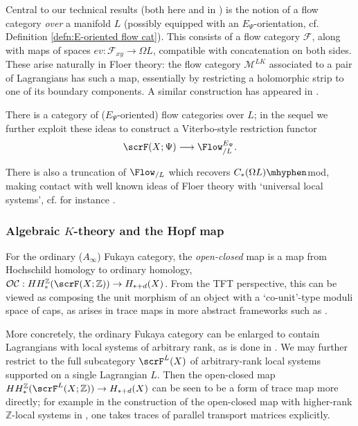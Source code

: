 \documentclass{TPmod}
\def\bZ{\mathbb{Z}}
\newcommand{\cC}{\mathcal{C}}
\newcommand{\cF}{\mathcal{F}}
\newcommand{\cM}{\mathcal{M}}
\newcommand{\cO}{\mathcal{O}}
\def\bZ{\mathbb{Z}}
\numberwithin{equation}{section}
\begin{document}
    Central to our technical results (both here and in \cite{PS4}) is the notion of a flow category \emph{over} a manifold $L$ (possibly equipped with an $E_\Psi$-orientation, cf. Definition \ref{defn:E-oriented flow cat}). This consists of a flow category $\cF$, along with maps of spaces $ev: \cF_{xy} \to \Omega L$, compatible with concatenation on both sides. These arise naturally in Floer theory: the flow category $\cM^{LK}$ associated to a pair of Lagrangians has such a map, essentially by restricting a holomorphic strip to one of its boundary components. A similar construction has appeared in \cite{Barraud-Cornea,Abouzaid:based_loops, BDHO}. 
    
There is a category of ($E_{\Psi}$-oriented) flow categories over $L$; in the sequel \cite{PS4} we further exploit these ideas to construct a Viterbo-style restriction functor
    \[
    \scrF(X;\Psi) \longrightarrow {\Flow}^{E_{\Psi}}_{/L}.
    \]

    
\begin{rmk}
   There is also a truncation of $\Flow_{/L}$ which recovers $C_*(\Omega L)\mhyphen$mod, making contact with well known ideas of  Floer theory with `universal local systems', cf. for instance \cite{BDHO, BDHO2}.
\end{rmk}

  
\subsubsection*{Algebraic $K$-theory and the Hopf map}
    For the ordinary ($A_\infty$) Fukaya category, the \emph{open-closed} map is a map from Hochschild homology to ordinary homology, $\cO\cC: HH_*^\bZ(\scrF(X; \bZ)) \to H_{*+d}(X)$. From the TFT perspective, this can be viewed as composing the unit morphism of an object with a `co-unit'-type moduli space of caps, as arises in trace maps in more abstract frameworks such as \cite{HSS}. 
    
    More concretely, the ordinary Fukaya category can be enlarged to contain Lagrangians with local systems of arbitrary rank, as is done in \cite{Konstantinov}. We may further restrict to the full subcategory $\scrF^L(X)$ of arbitrary-rank local systems supported on a single Lagrangian $L$. Then the open-closed map $HH_*^\bZ(\scrF^L(X; \bZ)) \to H_{*+d}(X)$ can be seen to be a form of trace map more directly; for example in the construction of the open-closed map with higher-rank $\bZ$-local systems in \cite[Section 3.2.2]{Konstantinov}, one takes traces of parallel transport matrices explicitly.
     
\end{document}
